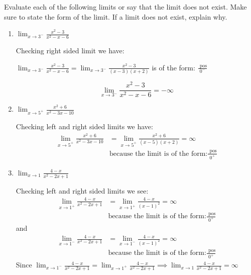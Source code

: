 \documentclass[nooutcomes]{ximera}
\begin{document}
\begin{problem}
  Evaluate each of the following limits or say that the limit does not exist. Make sure to state the form of the limit.
  If a limit does not exist, explain why.

  \begin{enumerate}
	\item
      $\displaystyle \lim_{x \to 3^-} \frac{x^2 - 3}{x^2 - x - 6}$
      \begin{freeResponse} Checking right sided limit we have:


         $ \lim_{x \to 3^-} \frac{x^2 - 3}{x^2 - x - 6} = \lim_{x \to 3^-} \frac{x^2 - 3}{(x-3)(x+2)}$  is of the form:  $\frac{\text{ pos}}{0^-}$

	$$\lim_{x \to 3^-} \frac{x^2 - 3}{x^2 - x - 6} =-\infty$$
      \end{freeResponse}

    \item
      $\displaystyle \lim_{x \to 5^+} \frac{x^2 + 6}{x^2 - 3x - 10}$
      \begin{freeResponse}
       Checking left and right sided limits we have:
        \begin{align*}
          \lim_{x \to 5^+} \frac{x^2 + 6}{x^2 - 3x - 10} &= \lim_{x \to 5^+} \frac{x^2 + 6}{(x-5)(x+2)}  = \infty \\
	&\text{because the limit is of the form:} \frac{\text{ pos}}{0^+}
        \end{align*}
      \end{freeResponse}

    \item
      $\displaystyle \lim_{x \to 1} \frac{4-x}{x^2 - 2x + 1}$
      \begin{freeResponse}
        Checking left and right sided limits we see:
        \begin{align*}
          \lim_{x \to 1^+} \frac{4-x}{x^2 - 2x + 1} &= \lim_{x \to 1^+}\frac{4-x}{(x-1)^2} = \infty\\
	&\text{because the limit is of the form:} \frac{\text{ pos}}{0^+}
        \end{align*}
 	 and
        \begin{align*}
 	\lim_{x \to 1^-} \frac{4-x}{x^2 - 2x + 1} &= \lim_{x \to 1^-}\frac{4-x}{(x-1)^2} = \infty\\
	&\text{because the limit is of the form:} \frac{\text{ pos}}{0^+}
	\end{align*}
	Since $\lim_{x \to 1^-} \frac{4-x}{x^2 - 2x + 1}=\lim_{x \to 1^+} \frac{4-x}{x^2 - 2x + 1} \implies  \lim_{x \to 1} \frac{4-x}{x^2 - 2x + 1} = \infty$
      \end{freeResponse}


\end{enumerate}
\end{problem}
\end{document}
